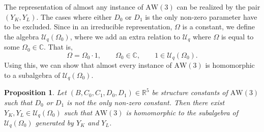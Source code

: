 \documentclass[pdftex]{sigma}
\numberwithin{equation}{section}
\newtheorem{Proposition}[Theorem]{Proposition}
 { \theoremstyle{definition}
\newtheorem{Definition}[Theorem]{Definition}
\newtheorem{Note}[Theorem]{Note}
\newtheorem{Example}[Theorem]{Example}
\newtheorem{Remark}[Theorem]{Remark} }
\newcommand{\RR}{\mathbb{R}}
\newcommand{\CC}{\mathbb{C}}
\newcommand{\aw}{\mathrm{AW}\!\left(3\right)}
\newcommand{\Uq}{\mathcal{U}_q}
\newcommand{\UqO}[1][q]{\mathcal{U}_{#1}\left(\Omega_0\right)}
\begin{document}
The representation of almost any instance of $\aw$ can be realized by the pair $(Y_K,Y_L)$. The cases where either $D_0$ or $D_1$ is the only non-zero parameter have to be excluded.
Since in an irreducible representation, $\Omega$ is a constant, we define the algebra $\UqO$, where we add an extra relation to $\Uq$ where $\Omega$ is equal to some $\Omega_0\in\CC$. That is,
\[
\Omega = \Omega_0 \cdot 1, \qquad \Omega_0\in\CC,\qquad 1\in\UqO.
\]
Using this, we can show that almost every instance of $\aw$ is homomorphic to a subalgebra of $\UqO$.
\begin{Proposition}\label{thm:awisouq}
	Let $(B,C_0,C_1,D_0,D_1)\in\RR^5$ be structure constants of $\aw$ such that $D_0$ or $D_1$ is not the only non-zero constant. Then there exist $ Y_K,Y_L\in\UqO$ such that $\aw$ is homomorphic to the subalgebra of $\UqO$ generated by $Y_K$ and $Y_L$.
\end{Proposition}
\end{document}
